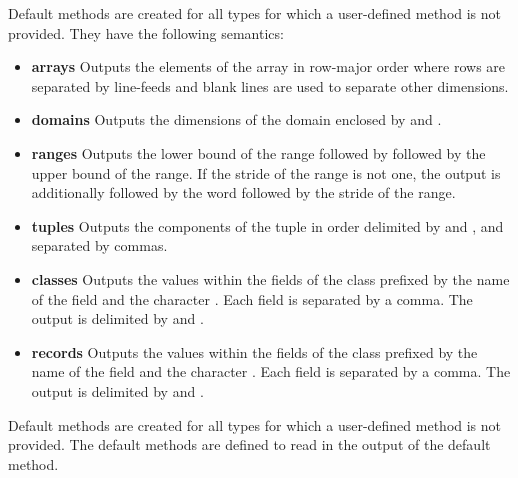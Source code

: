 

Default  methods are created for all types for which a user-defined
 method is not provided.  They have the following semantics:
\begin{itemize}
\item
{\bf arrays} Outputs the elements of the array in row-major order
where rows are separated by line-feeds and blank lines are used to
separate other dimensions.
\item
{\bf domains} Outputs the dimensions of the domain enclosed
by \chpl{[} and \chpl{]}.
\item
{\bf ranges} Outputs the lower bound of the range followed
by  followed by the upper bound of the range.  If the stride
of the range is not one, the output is additionally followed by the
word  followed by the stride of the range.
\item
{\bf tuples} Outputs the components of the tuple in order delimited
by \chpl{(} and \chpl{)}, and separated by commas.
\item
{\bf classes} Outputs the values within the fields of the class
prefixed by the name of the field and the character \chpl{=}.  Each
field is separated by a comma.  The output is delimited by \chpl{\{}
and \chpl{\}}.
\item
{\bf records} Outputs the values within the fields of the class
prefixed by the name of the field and the character \chpl{=}.  Each
field is separated by a comma.  The output is delimited by \chpl{(}
and \chpl{)}.
\end{itemize}

Default  methods are created for all types for which a user-defined
 method is not provided.  The default  methods are
defined to read in the output of the default  method.
